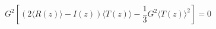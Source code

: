 \begin{equation}
G^2[(2\langle R(z) \rangle - I(z)) \langle T(z) \rangle
-\frac{1}{3}G^2  \langle T(z) \rangle^2] =0
\label{inttt}
\end{equation}

